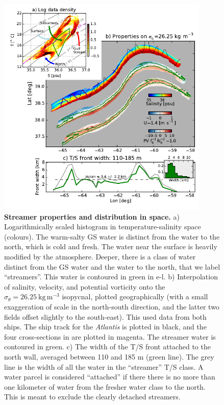 \documentclass{article}
\begin{document}
\begin{figure}[htbp]
  \centering
    \includegraphics[width=0.9\textwidth]{ComposeTSfigNew.pdf}  
  \caption{{\bf Streamer properties and distribution in space.}
a) Logarithmically scaled histogram in temperature-salinity space (colours). The warm-salty GS water is distinct from the water to the north, which is cold and fresh.  The water near the surface is heavily modified by the atmosphere.  Deeper, there is a class of water distinct from the GS water and the water to the north, that we label ``streamers''.  This water is contoured in green in e-l.  b) Interpolation of salinity, velocity, and potential vorticity onto the $\sigma_{\theta}=26.25\ \mathrm{kg\,m^{-3}}$ isopycnal, plotted geographically (with a small exaggeration of scale in the north-south direction, and the latter two fields offset slightly to the south-east). This used data from both ships.  The ship track for the \emph{Atlantis} is plotted in black, and the four cross-sections in  are plotted in magenta.  The streamer water is contoured in green.  c) The width of the T/S front attached to the north wall, averaged between 110 and 185 m (green line).  The grey line is the width of all the water in the ``streamer'' T/S class.  A water parcel is considered ``attached'' if there there is no more than one kilometer of water from the fresher water class to the north.  This is meant to exclude the clearly detached streamers.    
  } \label{fig:ComposeTSfigNew}
\end{figure}
\end{document}
